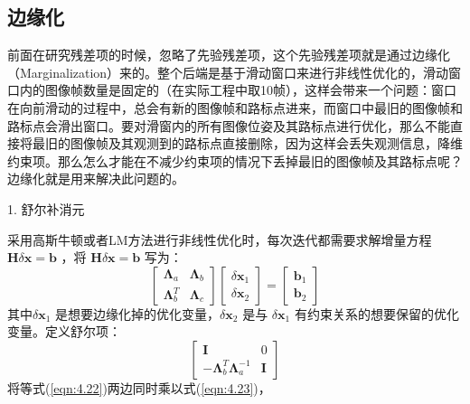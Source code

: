 \subsection{边缘化}
前面在研究残差项的时候，忽略了先验残差项，这个先验残差项就是通过边缘化（Marginalization）来的。整个后端是基于滑动窗口来进行非线性优化的，滑动窗口内的图像帧数量是固定的（在实际工程中取10帧），这样会带来一个问题：窗口在向前滑动的过程中，总会有新的图像帧和路标点进来，而窗口中最旧的图像帧和路标点会滑出窗口。要对滑窗内的所有图像位姿及其路标点进行优化，那么不能直接将最旧的图像帧及其观测到的路标点直接删除，因为这样会丢失观测信息，降维约束项。那么怎么才能在不减少约束项的情况下丢掉最旧的图像帧及其路标点呢？边缘化就是用来解决此问题的。

1. 舒尔补消元

采用高斯牛顿或者LM方法进行非线性优化时，每次迭代都需要求解增量方程 $\mathbf{H}\delta \mathbf{x}=\mathbf{b} $ ，将 $\mathbf{H}\delta \mathbf{x}=\mathbf{b} $ 写为：
\begin{equation}
\label{eqn:4.22}
\left[ \begin{array}{cc}
{\bm{\Lambda}_{a}} & {\bm{\Lambda}_{b}} \\ 
{\bm{\Lambda}_{b}^{T}} & {\bm{\Lambda}_{c}}
\end{array}\right] 
\left[ \begin{array}{c}
{\delta \mathbf{x}_{1}} \\ {\delta \mathbf{x}_{2}}
\end{array}\right]
=\left[ \begin{array}
{l}{\mathbf{b}_{1}} \\ {\mathbf{b}_{2}}
\end{array}\right]
\end{equation}
其中$\delta \mathbf{x}_1 $ 是想要边缘化掉的优化变量，$\delta \mathbf{x}_2 $ 是与 $\delta \mathbf{x}_1 $ 有约束关系的想要保留的优化变量。定义舒尔项：
\begin{equation}
\label{eqn:4.23}
\left[ \begin{array}{cc}
{\mathbf{I}} & {0} \\ 
{-\bm{\Lambda}_{b}^{T} \bm{\Lambda}_{a}^{-1}} & {\mathbf{I}}\end{array}\right]
\end{equation}
将等式(\ref{eqn:4.22})两边同时乘以式(\ref{eqn:4.23})，
